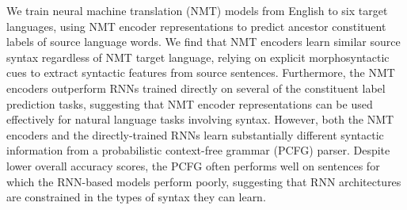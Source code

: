 We train neural machine translation (NMT) models from English to six target languages, using NMT encoder representations to predict ancestor constituent labels of source language words.  We find that NMT encoders learn similar source syntax regardless of NMT target language, relying on explicit morphosyntactic cues to extract syntactic features from source sentences.  Furthermore, the NMT encoders outperform RNNs trained directly on several of the constituent label prediction tasks, suggesting that NMT encoder representations can be used effectively for natural language tasks involving syntax.  However, both the NMT encoders and the directly-trained RNNs learn substantially different syntactic information from a probabilistic context-free grammar (PCFG) parser.  Despite lower overall accuracy scores, the PCFG often performs well on sentences for which the RNN-based models perform poorly, suggesting that RNN architectures are constrained in the types of syntax they can learn.
